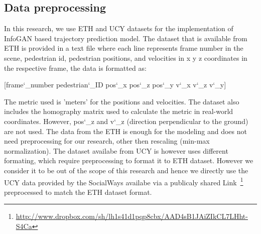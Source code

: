 \subsection{Data preprocessing}
In this research, we use ETH and UCY datasets for the implementation of InfoGAN based trajectory prediction model. The dataset that is available from ETH is provided in a text file where each line represents frame number in the scene, pedestrian id, pedestrian positions, and velocities in x y z coordinates in the respective frame, the data is formatted as:
\begin{center}
  [frame\char`_number pedestrian\char`_ID pos\char`_x pos\char`_z pos\char`_y v\char`_x v\char`_z v\char`_y]
\end{center}
The metric used is 'meters' for the positions and velocities. The dataset also includes the homography matrix used to calculate the metric in real-world coordinates. However, pos\char`_z and v\char`_z (direction perpendicular to the ground) are not used. The data from the ETH is enough for the modeling and does not need preprocessing for our research, other then rescaling (min-max normalization).\newline
The dataset availabe from UCY is however uses different formating, which require preprocessing to format it to ETH dataset. However we consider it to be out of the scope of this research and hence we directly use the UCY data provided by the SocialWays\cite[]{DBLP:journals/corr/ChenDHSSA16} availabe via a publicaly shared Link~\footnote{\url{http://www.dropbox.com/sh/lh1s41d1pqp8cbx/AAD4sB1JAiZIkCL7LHht-S4Ca}} preprocessed to match the ETH dataset format.
